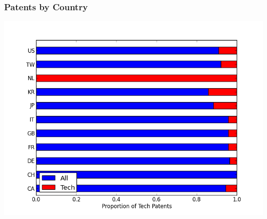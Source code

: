 \documentclass{beamer}
\begin{document}
\begin{frame}[t]\frametitle{Patents by Country} 

\begin{center}
  \includegraphics[scale=.5]{by_country_normalized.png}
  \label{fig:by_country_normalized}
\end{center}
\end{frame}
\end{document}
